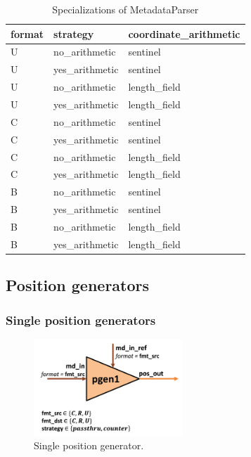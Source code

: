 \begin{table}[H]
\centering
\begin{tabular}{lll}
\toprule
 format   & strategy       & coordinate\_arithmetic   \\
\midrule
 U        & no\_arithmetic  & sentinel                \\
 U        & yes\_arithmetic & sentinel                \\
 U        & no\_arithmetic  & length\_field            \\
 U        & yes\_arithmetic & length\_field            \\
 C        & no\_arithmetic  & sentinel                \\
 C        & yes\_arithmetic & sentinel                \\
 C        & no\_arithmetic  & length\_field            \\
 C        & yes\_arithmetic & length\_field            \\
 B        & no\_arithmetic  & sentinel                \\
 B        & yes\_arithmetic & sentinel                \\
 B        & no\_arithmetic  & length\_field            \\
 B        & yes\_arithmetic & length\_field            \\
\bottomrule
\end{tabular}
\caption{Specializations of MetadataParser}
\label{tab:MetadataParser_specializations}
\end{table}

\subsection{Position generators}

\subsubsection{Single position generators}

\begin{figure}[H]
    \centering
    \includegraphics[width=0.5\textwidth]{figures/pgen1.png}
    \caption{Single position generator.}
    \label{fig:pgen1}
\end{figure}


